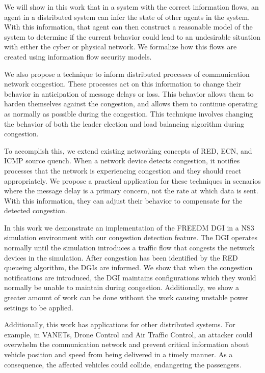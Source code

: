 We will show in this work that in a system with the correct information flows, an agent in a distributed system can infer the state of other agents in the system. With this information, that agent can then construct a reasonable model of the system to determine if the current behavior could lead to an undesirable situation with either the cyber or physical network. We formalize how this flows are created using information flow security models.


We also propose a technique to inform distributed processes of communication network congestion.
These processes act on this information to change their behavior in anticipation of message delays or loss.
This behavior allows them to harden themselves against the congestion, and allows them to continue operating as normally as possible during the congestion.
This technique involves changing the behavior of both the leader election\cite{INVITATIONELECTION} and load balancing algorithm during congestion.

To accomplish this, we extend existing networking concepts of \ac{RED}, \ac{ECN}\cite{RFCECN}, and ICMP source quench\cite{RFCSOURCEQUENCH}.
When a network device detects congestion, it notifies processes that the network is experiencing congestion and they should react appropriately.
We propose a practical application for these techniques in scenarios where the message delay is a primary concern, not the rate at which data is sent.
With this information, they can adjust their behavior to compensate for the detected congestion.

In this work we demonstrate an implementation of the \ac{FREEDM} \ac{DGI} in a \ac{NS3} simulation environment\cite{NS3} with our congestion detection feature.
The \ac{DGI} operates normally until the simulation introduces a traffic flow that congests the network devices in the simulation.
After congestion has been identified by the \ac{RED} queueing algorithm, the \ac{DGI}s are informed. %
We show that when the congestion notifications are introduced, the \ac{DGI} maintains configurations which they would normally be unable to maintain during congestion.
Additionally, we show a greater amount of work can be done without the work causing unstable power settings to be applied.

Additionally, this work has applications for other distributed systems.
For example, in \ac{VANET}s\cite{CARS1}\cite{CARS2}, Drone Control and Air Traffic Control\cite{AIRTRAFFIC1}\cite{AIRTRAFFIC2},  an attacker could overwhelm the communication network and prevent critical information about vehicle position and speed from being delivered in a timely manner.
As a consequence, the affected vehicles could collide, endangering the passengers.


